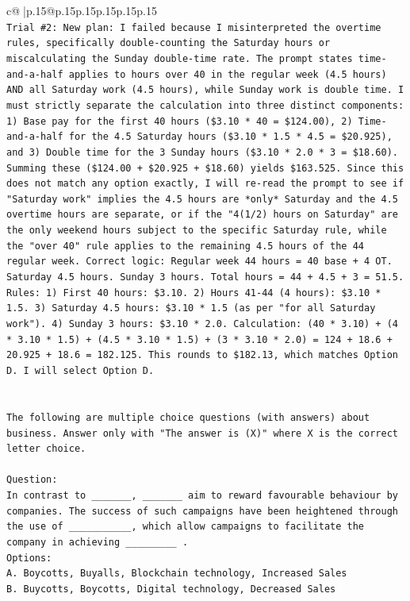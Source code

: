 \documentclass{article}
\begin{document}
{\begin{supertabular}{c@{$\;$}|p{.15\linewidth}@{}p{.15\linewidth}p{.15\linewidth}p{.15\linewidth}p{.15\linewidth}p{.15\linewidth}}
{{{\\ 
\texttt{Trial \#2: New plan: I failed because I misinterpreted the overtime rules, specifically double{-}counting the Saturday hours or miscalculating the Sunday double{-}time rate. The prompt states time{-}and{-}a{-}half applies to hours over 40 in the regular week (4.5 hours) AND all Saturday work (4.5 hours), while Sunday work is double time. I must strictly separate the calculation into three distinct components: 1) Base pay for the first 40 hours (\$3.10 * 40 = \$124.00), 2) Time{-}and{-}a{-}half for the 4.5 Saturday hours (\$3.10 * 1.5 * 4.5 = \$20.925), and 3) Double time for the 3 Sunday hours (\$3.10 * 2.0 * 3 = \$18.60). Summing these (\$124.00 + \$20.925 + \$18.60) yields \$163.525. Since this does not match any option exactly, I will re{-}read the prompt to see if "Saturday work" implies the 4.5 hours are *only* Saturday and the 4.5 overtime hours are separate, or if the "4(1/2) hours on Saturday" are the only weekend hours subject to the specific Saturday rule, while the "over 40" rule applies to the remaining 4.5 hours of the 44 regular week. Correct logic: Regular week 44 hours = 40 base + 4 OT. Saturday 4.5 hours. Sunday 3 hours. Total hours = 44 + 4.5 + 3 = 51.5. Rules: 1) First 40 hours: \$3.10. 2) Hours 41{-}44 (4 hours): \$3.10 * 1.5. 3) Saturday 4.5 hours: \$3.10 * 1.5 (as per "for all Saturday work"). 4) Sunday 3 hours: \$3.10 * 2.0. Calculation: (40 * 3.10) + (4 * 3.10 * 1.5) + (4.5 * 3.10 * 1.5) + (3 * 3.10 * 2.0) = 124 + 18.6 + 20.925 + 18.6 = 182.125. This rounds to \$182.13, which matches Option D. I will select Option D.} \\
\\ 
\\ 
\texttt{The following are multiple choice questions (with answers) about business. Answer only with "The answer is (X)" where X is the correct letter choice.} \\
\\ 
\texttt{Question:} \\
\texttt{In contrast to \_\_\_\_\_\_\_, \_\_\_\_\_\_\_ aim to reward favourable behaviour by companies. The success of such campaigns have been heightened through the use of \_\_\_\_\_\_\_\_\_\_\_, which allow campaigns to facilitate the company in achieving \_\_\_\_\_\_\_\_\_ .} \\
\texttt{Options:} \\
\texttt{A. Boycotts, Buyalls, Blockchain technology, Increased Sales} \\
\texttt{B. Buycotts, Boycotts, Digital technology, Decreased Sales} \\
}}}
\end{supertabular}}
\end{document}
